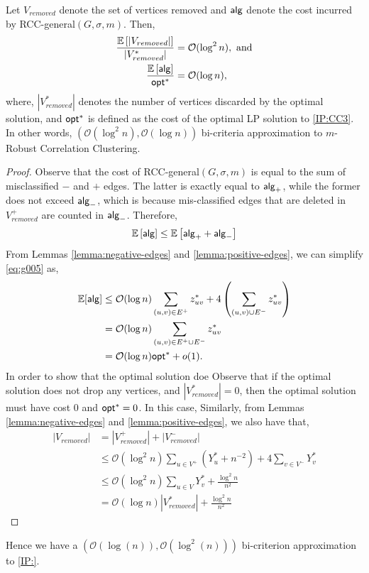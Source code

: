 \begin{theorem}
Let $V_{removed}$ denote the set of vertices removed and $\mathsf{alg}$ denote the cost incurred by {\sf RCC-general}$(G,\sigma,m)$. Then,
\begin{align*}
    \frac{\mathbb{E} \left[ \left| V_{removed} \right| \right]}{|V_{removed}^*|} &= \mathcal{O} (\log^2 n) , \text{ and}\\
    \frac{\mathbb{E} \left[ \mathsf{alg} \right]}{\mathsf{opt}^*} &= \mathcal{O} (\log n),
\end{align*}
where, $|V_{removed}^*|$ denotes the number of vertices discarded by the optimal solution, and $\mathsf{opt}^*$ is defined as the cost of the optimal LP solution to \ref{IP:CC3}. In other words, $(\mathcal{O} (\log^2 n), \mathcal{O} (\log n))$ bi-criteria approximation to $m$-Robust Correlation Clustering.
\end{theorem}
\begin{proof}
Observe that the cost of {\sf RCC-general}$(G,\sigma,m)$ is equal to the sum of misclassified $-$ and $+$ edges. The latter is exactly equal to $\mathsf{alg}_+$, while the former does not exceed $\mathsf{alg}_-$, which is because mis-classified edges that are deleted in $V_{removed}^+$ are counted in $\mathsf{alg}_-$. Therefore,
\begin{equation} \label{eq:g005}
    \mathbb{E} \left[\mathsf{alg} \right] \le \mathbb{E} \left[ \mathsf{alg}_+ + \mathsf{alg}_- \right]
\end{equation}
From Lemmas \ref{lemma:negative-edges} and \ref{lemma:positive-edges}, we can simplify \eqref{eq:g005} as,
\begin{align*}
    \mathbb{E} [\mathsf{alg}] &\le \mathcal{O} (\log n) \sum_{(u,v) \in E^+} z_{uv}^* + 4 \left( \sum_{(u,v) \cup E^-} z_{uv}^* \right)\\
    &= \mathcal{O} (\log n) \sum_{(u,v) \in E^+ \cup E^-} z_{uv}^*\\
    &= \mathcal{O} (\log n) \mathsf{opt}^* + o(1).
\end{align*}
In order to show that the optimal solution doe Observe that if the optimal solution does not drop any vertices, and $|V_{removed}^*| = 0$, then the optimal solution must have cost $0$ and $\mathsf{opt}^* = 0$. In this case, 
Similarly, from Lemmas \ref{lemma:negative-edges} and \ref{lemma:positive-edges}, we also have that,
\begin{align*}
    |V_{removed}| &= |V_{removed}^+| + |V_{removed}^-| \\
    &\le \mathcal{O} (\log^2 n) \sum_{u \in V^+} \left( Y^*_u + n^{-2}\right) + 4 \sum_{v \in V^-} Y_v^*\\
    &\le \mathcal{O} (\log^2 n) \sum_{u \in V} Y_v^* + \frac{\log^2 n}{n^2} \\
    &= \mathcal{O} (\log n) |V_{removed}^*| + \frac{\log^2 n}{n^2}
\end{align*}
\end{proof}
Hence we have a $(\mathcal{O}(\log(n)), \mathcal{O}(\log^2(n)))$ bi-criterion approximation to \ref{IP:}.


